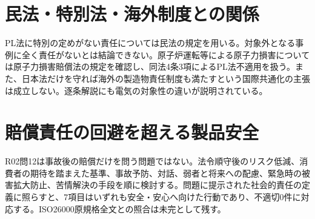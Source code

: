 \section{民法・特別法・海外制度との関係}
\label{theory:pl:otherlaw}
PL法に特別の定めがない責任については民法の規定を用いる。対象外となる事例に全く責任がないとは結論できない。原子炉運転等による原子力損害については原子力損害賠償法の規定を確認し、同法4条3項によるPL法不適用を扱う。また、日本法だけを守れば海外の製造物責任制度も満たすという国際共通化の主張は成立しない。逐条解説にも電気の対象性の違いが説明されている。\autocite{pl_nuclear_statute,pl_statute,pl_definitions2018}

\section{賠償責任の回避を超える製品安全}
\label{theory:pl:csr}
R02問12は事故後の賠償だけを問う問題ではない。法令順守後のリスク低減、消費者の期待を踏まえた基準、事故予防、対話、弱者と将来への配慮、緊急時の被害拡大防止、苦情解決の手段を順に検討する。問題に提示された社会的責任の定義に照らすと、7項目はいずれも安全・安心へ向けた行動であり、不適切0件に対応する。ISO26000原規格全文との照合は未完として残す。\autocite{pl_product_csr2016}
